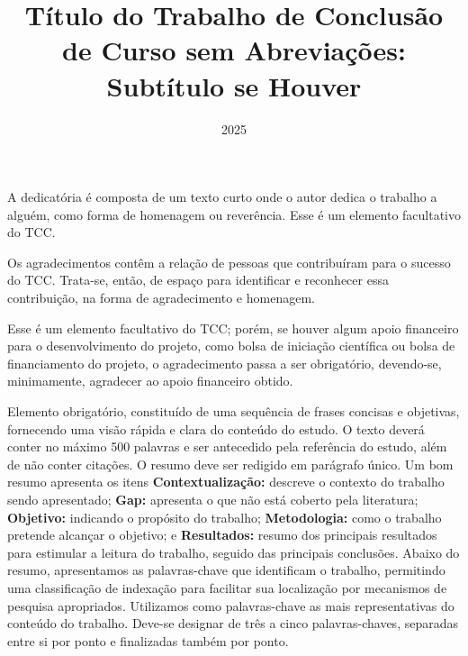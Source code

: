 \documentclass{eic-bcc-tcc}
\title{Título do Trabalho de Conclusão de Curso sem Abreviações: Subtítulo se Houver}
\date{2025}
\begin{document}
\maketitle

\begin{dedicatoria}
A dedicatória é composta de um texto curto onde o autor dedica o trabalho a alguém, como forma de homenagem ou reverência. Esse é um elemento facultativo do TCC.
\end{dedicatoria}


\begin{agradecimentos}
Os agradecimentos contêm a relação de pessoas que contribuíram para o sucesso do TCC.
Trata-se, então, de espaço para identificar e reconhecer essa contribuição, na forma de agradecimento e homenagem.

Esse é um elemento facultativo do TCC; porém, se houver algum apoio financeiro para o desenvolvimento do projeto, como bolsa de iniciação científica ou bolsa de financiamento do projeto, o agradecimento passa a ser obrigatório, devendo-se, minimamente, agradecer ao apoio financeiro obtido.
\end{agradecimentos}


\makeapproval


\begin{resumo}
Elemento obrigatório, constituído de uma sequência de frases concisas e objetivas, fornecendo uma visão rápida e clara do conteúdo do estudo. O texto deverá conter no máximo 500 palavras e ser antecedido pela referência do estudo, além de não conter citações. O resumo deve ser redigido em parágrafo único.
Um bom resumo apresenta os itens 
\textbf{Contextualização:} descreve o contexto do trabalho sendo apresentado; 
\textbf{Gap:} apresenta o que não está coberto pela literatura; 
\textbf{Objetivo:} indicando o propósito do trabalho; 
\textbf{Metodologia:} como o trabalho pretende alcançar o objetivo; e 
\textbf{Resultados:} resumo dos principais resultados para estimular a leitura do trabalho, seguido das principais conclusões.
Abaixo do resumo, apresentamos as palavras-chave que identificam o trabalho, permitindo uma classificação de indexação para facilitar sua localização por mecanismos de pesquisa apropriados. Utilizamos como palavras-chave as mais representativas do conteúdo do trabalho. Deve-se designar de três a cinco palavras-chaves, separadas entre si por ponto e finalizadas também por ponto.

\end{resumo}
\end{document}
